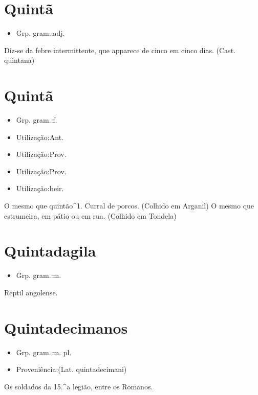 \section{Quintã}
\begin{itemize}
\item {Grp. gram.:adj.}
\end{itemize}
Diz-se da febre intermittente, que apparece de cinco em cinco dias.
(Cast. \textunderscore quintana\textunderscore )
\section{Quintã}
\begin{itemize}
\item {Grp. gram.:f.}
\end{itemize}
\begin{itemize}
\item {Utilização:Ant.}
\end{itemize}
\begin{itemize}
\item {Utilização:Prov.}
\end{itemize}
\begin{itemize}
\item {Utilização:Prov.}
\end{itemize}
\begin{itemize}
\item {Utilização:beir.}
\end{itemize}
O mesmo que \textunderscore quintão\textunderscore ^1.
Curral de porcos. (Colhido em Arganil)
O mesmo que \textunderscore estrumeira\textunderscore , em pátio ou em rua. (Colhido em Tondela)
\section{Quintadagila}
\begin{itemize}
\item {Grp. gram.:m.}
\end{itemize}
Reptil angolense.
\section{Quintadecimanos}
\begin{itemize}
\item {Grp. gram.:m. pl.}
\end{itemize}
\begin{itemize}
\item {Proveniência:(Lat. \textunderscore quintadecimani\textunderscore )}
\end{itemize}
Os soldados da 15.^a legião, entre os Romanos.
